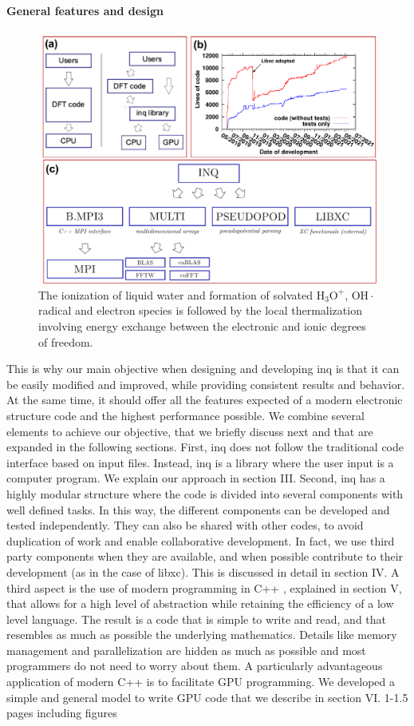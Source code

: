 \paragraph{General features and design}
\begin{figure}[h]
    \centering
    \includegraphics[width=1.0\linewidth]{figures/INQ_design_features.pdf}
    \caption{
        The ionization of liquid water and formation of solvated \(\mathrm{H_3O^+}\), \(\mathrm{OH\cdot}\) radical and electron species is followed by the local thermalization involving energy exchange between the electronic and ionic degrees of freedom.
    }
    \label{fig:water}
\end{figure}
This is why our main objective when designing and
developing inq is that it can be easily modified and improved, while providing consistent results and behavior.
At the same time, it should offer all the features expected
of a modern electronic structure code and the highest
performance possible. We combine several elements to
achieve our objective, that we briefly discuss next and
that are expanded in the following sections.
First, inq does not follow the traditional code interface based on input files. Instead, inq is a library where
the user input is a computer program. We explain our
approach in section III.
Second, inq has a highly modular structure where the
code is divided into several components with well defined
tasks. In this way, the different components can be developed and tested independently. They can also be shared
with other codes, to avoid duplication of work and enable
collaborative development. In fact, we use third party
components when they are available, and when possible
contribute to their development (as in the case of libxc).
This is discussed in detail in section IV.
A third aspect is the use of modern programming in
C++ , explained in section V, that allows for a high level
of abstraction while retaining the efficiency of a low level
language. The result is a code that is simple to write
and read, and that resembles as much as possible the underlying mathematics. Details like memory management
and parallelization are hidden as much as possible and
most programmers do not need to worry about them. A
particularly advantageous application of modern C++ is
to facilitate GPU programming. We developed a simple
and general model to write GPU code that we describe
in section VI.
1-1.5 pages including figures
